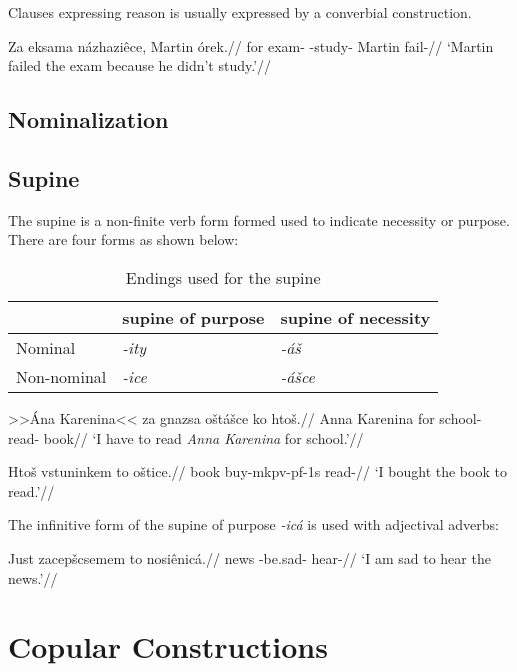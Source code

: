 Clauses expressing reason is usually expressed by a converbial construction.

\pex
\begingl
\gla Za eksama názhaziêce, Martin órek.//
\glb for exam- -study- Martin fail-//
\glft `Martin failed the exam because he didn't study.'//
\endgl
\xe


\subsection{Nominalization}



\subsection{Supine}
The supine is a non-finite verb form formed used to indicate necessity or purpose. There are four forms as shown below:

\begin{table}[h!]
	\centering\small
	\caption{Endings used for the supine}
	\begin{tabularx}{0.8\textwidth}{MMM}
		\toprule
		&{\sc supine of purpose}&{\sc supine of necessity}\\
		\midrule
		Nominal & \textit{-ity} & \textit{-á\v{s}}\\
		\addlinespace
		Non-nominal & \textit{-ice} & \textit{-á\v{s}ce}\\
		\bottomrule
	\end{tabularx}
\end{table}


	\pex
\begingl
\gla >>Ána Karenina<< za gnazsa o\v{s}tá\v{s}ce ko hto\v{s}.//
\glb Anna Karenina for school- read-  book//
\glft `I have to read \textit{Anna Karenina} for school.'//
\endgl
\xe

	\pex
\begingl
\gla Hto\v{s} vstuninkem to o\v{s}tice.//
\glb book buy-mk{pv-pf-1s}  read-//
\glft `I bought the book to read.'//
\endgl
\xe

\par The infinitive form of the supine of purpose \textit{-icá} is used with adjectival adverbs:

\pex
\begingl
\gla Just zacep\v{s}csemem to nosiênicá.//
\glb news -be.sad-  hear-//
\glft `I am sad to hear the news.'//
\endgl
\xe

\section{Copular Constructions}
